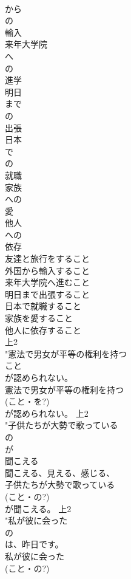 \documentclass[8pt]{extreport}
\begin{document}
\begin{CJK}{UTF8}{min}
\\	から
\\	の
\\	輸入
\\	来年大学院
\\	へ
\\	の
\\	進学
\\	明日
\\	まで
\\	の
\\	出張
\\	日本
\\	で
\\	の
\\	就職
\\	家族
\\	への
\\	愛
\\	他人
\\	への
\\	依存
\\	友達と旅行をすること
\\	外国から輸入すること
\\	来年大学院へ進むこと
\\	明日まで出張すること
\\	日本で就職すること
\\	家族を愛すること
\\	他人に依存すること
\\	上2
\\	"憲法で男女が平等の権利を持つ
\\	こと
\\	が認められない。 
\\	憲法で男女が平等の権利を持つ
\\	(こと・を?)
\\	が認められない。			上2
\\	"子供たちが大勢で歌っている
\\	の
\\	が
\\	聞こえる
\\	聞こえる、見える、感じる、
\\	子供たちが大勢で歌っている
\\	(こと・の?)
\\	が聞こえる。			上2
\\	"私が彼に会った
\\	の
\\	は、昨日です。
\\	私が彼に会った
\\	(こと・の?)

\end{CJK}
\end{document}

